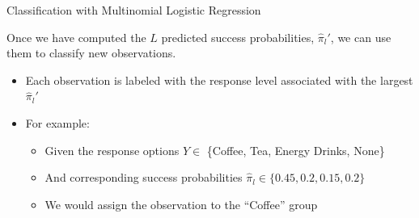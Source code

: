 \documentclass{beamer}\usepackage[]{graphicx}\usepackage[]{color}
\begin{document}

\begin{frame}{Classification with Multinomial Logistic Regression}
  
  Once we have computed the $L$ predicted success probabilities, $\hat{\pi}_l'$, 
  we can use them to classify new observations.
  \vc
  \begin{itemize}
  \item Each observation is labeled with the response level associated with the 
    largest $\hat{\pi}_l'$
    \vc
  \item For example:
    \begin{itemize}
    \item Given the response options $Y \in $
      \{Coffee, Tea, Energy Drinks, None\}
      \vc
    \item And corresponding success probabilities $\hat{\pi}_l \in 
      \{0.45, 0.2, 0.15, 0.2\}$
      \vc
    \item We would assign the observation to the ``Coffee'' group 
    \end{itemize}
  \end{itemize}

\end{frame}

\end{document}
